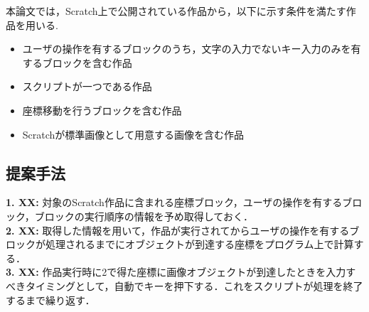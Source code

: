 \documentclass[uplatex,dvipdfmx,a4paper,twocolumn,base=11pt,jbase=11pt,ja=standard]{bxjsarticle}  %
\newcommand{\todo}[1]{\colorbox{yellow}{{\bf TODO}:}{\color{red} {\textbf{[#1]}}}}
\begin{document}


本論文では，Scratch上で公開されている作品から，以下に示す条件を満たす作品を用いる.
\begin{itemize}
 \item ユーザの操作を有するブロックのうち，文字の入力でないキー入力のみを有するブロックを含む作品
 \item スクリプトが一つである作品
 \item 座標移動を行うブロックを含む作品
 \item Scratchが標準画像として用意する画像を含む作品
\end{itemize}




\subsection{提案手法}



\noindent\textbf{1. XX: }対象のScratch作品に含まれる座標ブロック，ユーザの操作を有するブロック，ブロックの実行順序の情報を予め取得しておく．\\
\noindent\textbf{2. XX: }取得した情報を用いて，作品が実行されてからユーザの操作を有するブロックが処理されるまでにオブジェクトが到達する座標をプログラム上で計算する．\\
\noindent\textbf{3. XX: }作品実行時に2で得た座標に画像オブジェクトが到達したときを入力すべきタイミングとして，自動でキーを押下する．これをスクリプトが処理を終了するまで繰り返す．
\end{document}

